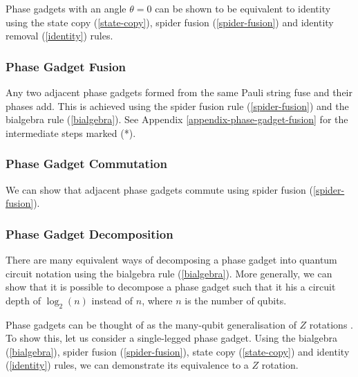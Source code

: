 Phase gadgets with an angle $\theta = 0$ can be shown to be equivalent to identity using the state copy (\ref{state-copy}), spider fusion (\ref{spider-fusion}) and identity removal (\ref{identity}) rules.



\subsubsection{Phase Gadget Fusion}%
\label{phase-gadget-fusion}

Any two adjacent phase gadgets formed from the same Pauli string fuse and their phases add. This is achieved using the spider fusion rule (\ref{spider-fusion}) and the bialgebra rule (\ref{bialgebra}). See Appendix  \ref{appendix-phase-gadget-fusion} for the intermediate steps marked (*).



\subsubsection{Phase Gadget Commutation}%
\label{phase-gadget-commutation}

We can show that adjacent phase gadgets commute using spider fusion (\ref{spider-fusion}).



\subsubsection{Phase Gadget Decomposition}%
\label{phase-gadget-decomposition}

There are many equivalent ways of decomposing a phase gadget into quantum circuit notation using the bialgebra rule (\ref{bialgebra}). More generally, we can show that it is possible to decompose a phase gadget such that it his a circuit depth of $\log_2(n)$ instead of $n$, where $n$ is the number of qubits.


Phase gadgets can be thought of as the many-qubit generalisation of $Z$ rotations \cite{Yeung2020}. To show this, let us consider a single-legged phase gadget. Using the bialgebra (\ref{bialgebra}), spider fusion (\ref{spider-fusion}), state copy (\ref{state-copy}) and identity (\ref{identity}) rules, we can demonstrate its equivalence to a $Z$ rotation.

\label{phase-gadget-single-leg}
